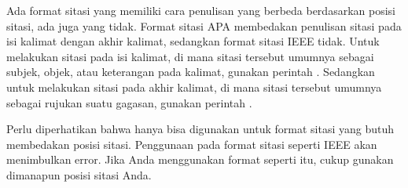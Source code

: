 Ada format sitasi yang memiliki cara penulisan yang berbeda berdasarkan posisi sitasi, ada juga yang tidak.
Format sitasi APA membedakan penulisan sitasi pada isi kalimat dengan akhir kalimat, sedangkan format sitasi IEEE tidak.
Untuk melakukan sitasi pada isi kalimat, di mana sitasi tersebut umumnya sebagai subjek, objek, atau keterangan pada kalimat, gunakan perintah .
Sedangkan untuk melakukan sitasi pada akhir kalimat, di mana sitasi tersebut umumnya sebagai rujukan suatu gagasan, gunakan perintah .

Perlu diperhatikan bahwa  hanya bisa digunakan untuk format sitasi yang butuh membedakan posisi sitasi.
Penggunaan  pada format sitasi seperti IEEE akan menimbulkan error.
Jika Anda menggunakan format seperti itu, cukup gunakan  dimanapun posisi sitasi Anda.

